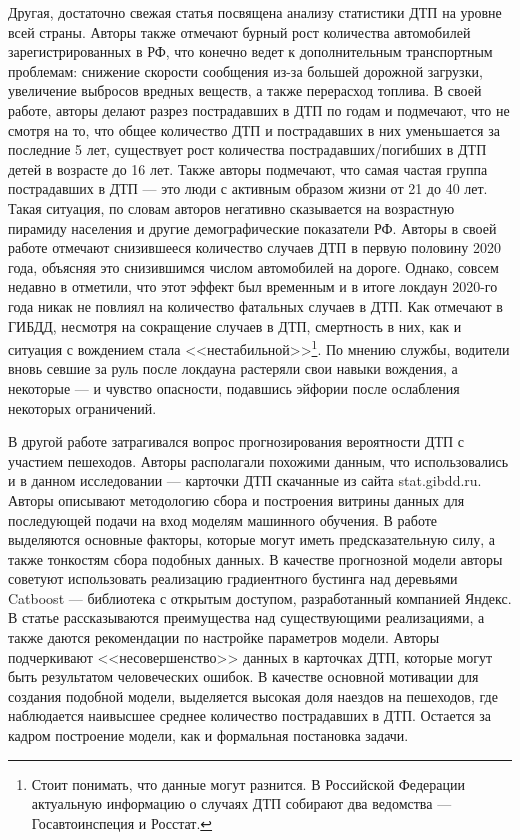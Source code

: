\documentclass[a4paper, 14pt]{article}
\begin{document}
Другая, достаточно свежая статья \cite{klachkiva2020analiz} посвящена анализу статистики ДТП на уровне всей страны. Авторы также отмечают бурный рост количества автомобилей зарегистрированных в РФ, что конечно ведет к дополнительным транспортным проблемам: снижение скорости сообщения из-за большей дорожной загрузки, увеличение выбросов вредных веществ, а также перерасход топлива. В своей работе, авторы делают разрез пострадавших в ДТП по годам и подмечают, что не смотря на то, что общее количество ДТП и пострадавших в них уменьшается за последние 5 лет, существует рост количества пострадавших/погибших в ДТП детей в возрасте до 16 лет. Также авторы подмечают, что самая частая группа пострадавших в ДТП --- это люди с активным образом жизни от 21 до 40 лет. Такая ситуация, по словам авторов негативно сказывается на возрастную пирамиду населения и другие демографические показатели РФ. Авторы в своей работе отмечают снизившееся количество случаев ДТП в первую половину 2020 года, объясняя это снизившимся числом автомобилей на дороге. Однако, совсем недавно в \cite{rbkNews} отметили, что этот эффект был временным и в итоге локдаун 2020-го года никак не повлиял на количество фатальных случаев в ДТП. Как отмечают в ГИБДД, несмотря на сокращение случаев в ДТП, смертность в них, как и ситуация с вождением стала <<нестабильной>>\footnote{Стоит понимать, что данные могут разнится. В Российской Федерации актуальную информацию о случаях ДТП собирают два ведомства --- Госавтоинспеция и Росстат.}. По мнению службы, водители вновь севшие за руль после локдауна растеряли свои навыки вождения, а некоторые --- и чувство опасности, подавшись эйфории после ослабления некоторых ограничений.

В другой работе \cite{kuzmenko2020analysis} затрагивался вопрос прогнозирования вероятности ДТП с участием пешеходов. Авторы располагали похожими данным, что использовались и в данном исследовании --- карточки ДТП скачанные из сайта stat.gibdd.ru. Авторы описывают методологию сбора и построения витрины данных для последующей подачи на вход моделям машинного обучения. В работе выделяются основные факторы, которые могут иметь предсказательную силу, а также тонкостям сбора подобных данных. В качестве прогнозной модели авторы советуют использовать реализацию градиентного бустинга над деревьями Catboost --- библиотека с открытым доступом, разработанный компанией Яндекс. В статье рассказываются преимущества над существующими реализациями, а также даются рекомендации по настройке параметров модели. Авторы подчеркивают <<несовершенство>> данных в карточках ДТП, которые могут быть результатом человеческих ошибок. В качестве основной мотивации для создания подобной модели, выделяется высокая доля наездов на пешеходов, где наблюдается наивысшее среднее количество пострадавших в ДТП. Остается за кадром построение модели, как и формальная постановка задачи.
\end{document}
